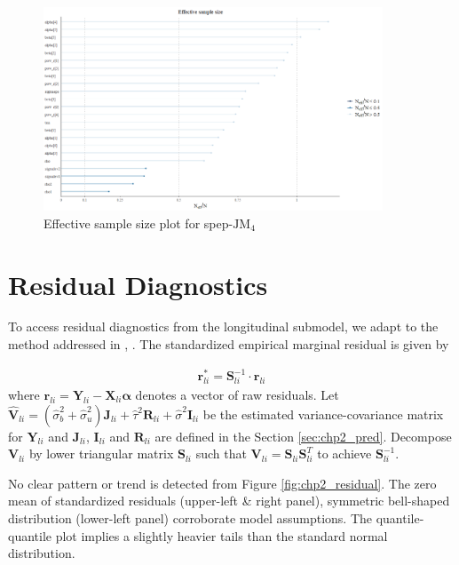 \begin{figure}[H]
\centering
\includegraphics[width=0.9\textwidth]{Figures/Chp2_eff.png}
\caption{Effective sample size plot for spep-$\mbox{JM}_4$}
\label{fig:chp2_eff}
\end{figure}


\section{Residual Diagnostics}

To access residual diagnostics from the longitudinal submodel, we adapt to the method addressed in \cite{Diggle2015}, \cite{Szczesniak2020}. The standardized empirical marginal residual is given by

\begin{align}
    \bm{r}^*_{li}=\bm{S}^{-1}_{li} \cdot \bm{r}_{li}
\end{align}
where $\bm{r}_{li}=\bm{Y}_{li}-\bm{X}_{li}\bm{\alpha}$ denotes a vector of raw residuals. Let $\widehat{\bm{V}}_{li}=(\hat{\sigma}^2_b+\hat{\sigma}^2_u)\bm{J}_{li}+ \hat{\tau}^2 \bm{R}_{li} + \hat{\sigma}^2 \bm{I}_{li}$ be the estimated variance-covariance matrix for $\bm{Y}_{li}$ and $\bm{J}_{li}$, $\bm{I}_{li}$ and $\bm{R}_{li}$ are defined in the Section \ref{sec:chp2_pred}. Decompose $\bm{V}_{li}$ by lower triangular matrix $\bm{S}_{li}$ such that $\bm{V}_{li}=\bm{S}_{li}\bm{S}_{li}^T$ to achieve $\bm{S}^{-1}_{li}$.  

No clear pattern or trend is detected from Figure \ref{fig:chp2_residual}. The zero mean of standardized residuals (upper-left \& right panel), symmetric bell-shaped distribution (lower-left panel) corroborate model assumptions. The quantile-quantile plot implies a slightly heavier tails than the standard normal distribution.


